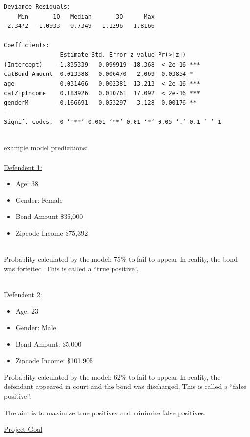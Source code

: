\documentclass{article}
\begin{document}
\begin{center}
\begin{verbatim}
Deviance Residuals: 
    Min       1Q   Median       3Q      Max  
-2.3472  -1.0933  -0.7349   1.1296   1.8166  

Coefficients:
                Estimate Std. Error z value Pr(>|z|)    
(Intercept)    -1.835339   0.099919 -18.368  < 2e-16 ***
catBond_Amount  0.013388   0.006470   2.069  0.03854 *  
age             0.031466   0.002381  13.213  < 2e-16 ***
catZipIncome    0.183926   0.010761  17.092  < 2e-16 ***
genderM        -0.166691   0.053297  -3.128  0.00176 ** 
---
Signif. codes:  0 ‘***’ 0.001 ‘**’ 0.01 ‘*’ 0.05 ‘.’ 0.1 ‘ ’ 1
\end{verbatim}
\end{center}

~\\
example model predicitions:
~\\
~\\
\underline{Defendent 1:}
~\\
\begin{itemize}
\item Age: 38
\item Gender: Female 
\item Bond Amount \$35,000
\item Zipcode Income  \$75,392
\end{itemize}
~\\
Probablity calculated by the model: 75\% to fail to appear
In reality, the bond was forfeited. This is called a ``true positive''.


~\\
\underline{Defendent 2:}
~\\
\begin{itemize}
\item Age:             23   
\item Gender:          Male
\item Bond Amount:    \$5,000
\item Zipcode Income: \$101,905
\end{itemize}

Probablity calculated by the model: 62\% to fail to appear
In reality, the defendant appeared in court and the bond was discharged. 
This is called a ``false positive''.

The aim is to maximize true positives and minimize false positives. 

\underline{Project Goal}
\end{document}
